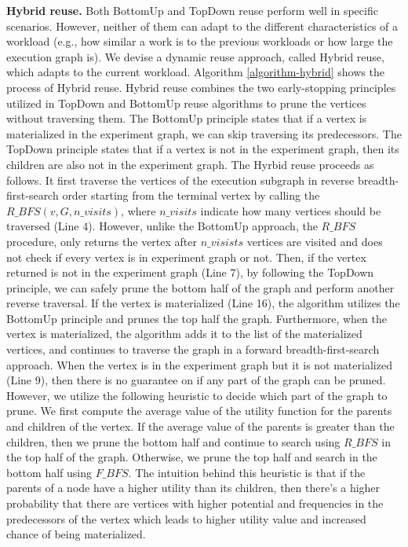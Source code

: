 {\textbf{Hybrid reuse.}
Both BottomUp and TopDown reuse perform well in specific scenarios. 
However, neither of them can adapt to the different characteristics of a workload (e.g., how similar a work is to the previous workloads or how large the execution graph is).
We devise a dynamic reuse approach, called Hybrid reuse, which adapts to the current workload.
Algorithm \ref{algorithm-hybrid} shows the process of Hybrid reuse.
Hybrid reuse combines the two early-stopping principles utilized in TopDown and BottomUp reuse algorithms to prune the vertices without traversing them.
The BottomUp principle states that if a vertex is materialized in the experiment graph, we can skip traversing its predecessors.
The TopDown principle states that if a vertex is not in the experiment graph, then its children are also not in the experiment graph.
The Hyrbid reuse proceeds as follows.
It first traverse the vertices of the execution subgraph in reverse breadth-first-search order starting from the terminal vertex by calling the $R\_BFS(v, G, n\_visits)$, where $n\_visits$ indicate how many vertices should be traversed (Line 4).
However, unlike the BottomUp approach, the $R\_BFS$ procedure, only returns the vertex after $n\_visists$ vertices are visited and does not check if every vertex is in experiment graph or not.
Then, if the vertex returned is not in the experiment graph (Line 7), by following the TopDown principle, we can safely prune the bottom half of the graph and perform another reverse traversal.
If the vertex is materialized (Line 16), the algorithm utilizes the BottomUp principle and prunes the top half the graph.
Furthermore, when the vertex is materialized, the algorithm adds it to the list of the materialized vertices, and continues to traverse the graph in a forward breadth-first-search approach.
When the vertex is in the experiment graph but it is not materialized (Line 9), then there is no guarantee on if any part of the graph can be pruned.
However, we utilize the following heuristic to decide which part of the graph to prune.
We first compute the average value of the utility function for the parents and children of the vertex.
If the average value of the parents is greater than the children, then we prune the bottom half and continue to search using $R\_BFS$ in the top half of the graph.
Otherwise, we prune the top half and search in the bottom half using $F\_BFS$.
The intuition behind this heuristic is that if the parents of a node have a higher utility than its children, then there's a higher probability that there are vertices with higher potential and frequencies in the predecessors of the vertex which leads to higher utility value and increased chance of being materialized.

}
